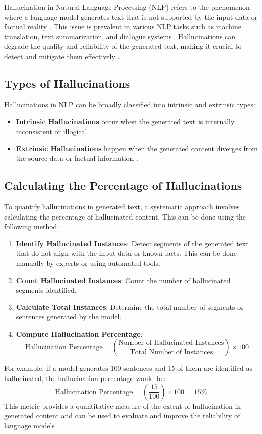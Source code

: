 Hallucination in Natural Language Processing (NLP) refers to the phenomenon where a language model generates text that is not supported by the input data or factual reality \cite{venkit2024confidently}. This issue is prevalent in various NLP tasks such as machine translation, text summarization, and dialogue systems \cite{agrawal2024language}. Hallucinations can degrade the quality and reliability of the generated text, making it crucial to detect and mitigate them effectively \cite{Ji2022Survey}.

\subsection{Types of Hallucinations}

Hallucinations in NLP can be broadly classified into intrinsic and extrinsic types:
\begin{itemize}
    \item \textbf{Intrinsic Hallucinations} occur when the generated text is internally inconsistent or illogical.
    \item \textbf{Extrinsic Hallucinations} happen when the generated content diverges from the source data or factual information \cite{Huang2023A}.
\end{itemize}

\subsection{Calculating the Percentage of Hallucinations}

To quantify hallucinations in generated text, a systematic approach involves calculating the percentage of hallucinated content. This can be done using the following method:
\begin{enumerate}
    \item \textbf{Identify Hallucinated Instances}: Detect segments of the generated text that do not align with the input data or known facts. This can be done manually by experts or using automated tools.
    \item \textbf{Count Hallucinated Instances}: Count the number of hallucinated segments identified.
    \item \textbf{Calculate Total Instances}: Determine the total number of segments or sentences generated by the model.
    \item \textbf{Compute Hallucination Percentage}:
    \[
    \text{Hallucination Percentage} = \left( \frac{\text{Number of Hallucinated Instances}}{\text{Total Number of Instances}} \right) \times 100
    \]
\end{enumerate}
For example, if a model generates 100 sentences and 15 of them are identified as hallucinated, the hallucination percentage would be:
\[
\text{Hallucination Percentage} = \left( \frac{15}{100} \right) \times 100 = 15\%
\]
This metric provides a quantitative measure of the extent of hallucination in generated content and can be used to evaluate and improve the reliability of language models \cite{Xiao2021On}.

